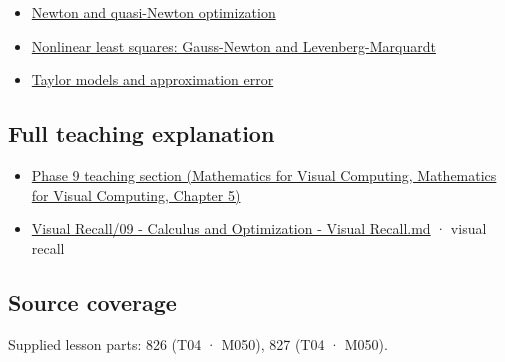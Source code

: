 \begin{itemize}
\tightlist
\item
  \hyperref[appendix-54c8f5828387]{Newton and quasi-Newton optimization}
\item
  \hyperref[appendix-2c2df8345991]{Nonlinear least squares: Gauss-Newton and Levenberg-Marquardt}
\item
  \hyperref[appendix-32f39e9a3738]{Taylor models and approximation error}
\end{itemize}

\subsection{Full teaching explanation}\label{appendix-6ac071f8b50c-full-teaching-explanation}

\begin{itemize}
\tightlist
\item
  \href{../02-Mathematics-for-Visual-Computing/main.pdf\#nameddest=02-foundations-ii-ch021-jacobians-curvature-and-local-approximation}{Phase 9 teaching section (Mathematics for Visual Computing, Mathematics for Visual Computing, Chapter 5)}
\item
  \hyperref[appendix-adf48f5dc5c1]{Visual Recall/09 - Calculus and Optimization - Visual Recall.md} · visual recall
\end{itemize}

\subsection{Source coverage}\label{appendix-6ac071f8b50c-source-coverage}

Supplied lesson parts: 826 (T04 · M050), 827 (T04 · M050).
